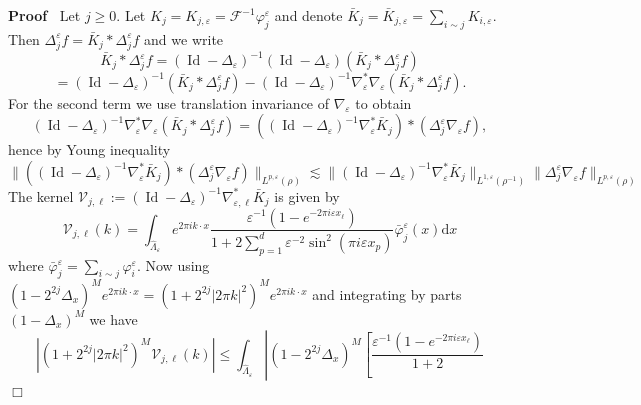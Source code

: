 \documentclass[a4paper,11pt]{article}
\newcommand{\assign}{:=}
\newcommand{\mathd}{\mathrm{d}}
\newcommand{\tmop}[1]{\ensuremath{\operatorname{#1}}}
\newenvironment{proof}{\noindent\textbf{Proof\ }}{\hspace*{\fill}$\Box$\medskip}
\numberwithin{equation}{section}
\begin{document}
\begin{proof}
  Let $j \geqslant 0$. Let $K_j = K_{j, \varepsilon} = \mathcal{F}^{- 1}
  \varphi^{\varepsilon}_j$ and denote $\bar{K}_j = \bar{K}_{j, \varepsilon} =
  \sum_{i \sim j} K_{i, \varepsilon}$. Then 
  $\Delta^{\varepsilon}_j f = \bar{K}_j \ast \Delta^{\varepsilon}_j f$ and we
  write
  \[ \bar{K}_j \ast \Delta^{\varepsilon}_j f = (\tmop{Id} -
     \Delta_{\varepsilon})^{- 1} (\tmop{Id} - \Delta_{\varepsilon}) (\bar{K}_j
     \ast \Delta^{\varepsilon}_j f) \]
  \begin{equation}
    = (\tmop{Id} - \Delta_{\varepsilon})^{- 1} (\bar{K}_j \ast
    \Delta^{\varepsilon}_j f) - (\tmop{Id} - \Delta_{\varepsilon})^{- 1}
    \nabla^{\ast}_{\varepsilon} \nabla_{\varepsilon} (\bar{K}_j \ast
    \Delta^{\varepsilon}_j f) . \label{eq:16}
  \end{equation}
  For the second term we use translation invariance of
  $\nabla_{\varepsilon}$ to obtain
  \[ (\tmop{Id} - \Delta_{\varepsilon})^{- 1} \nabla^{\ast}_{\varepsilon}
     \nabla_{\varepsilon} (\bar{K}_j \ast \Delta^{\varepsilon}_j f) =
     ((\tmop{Id} - \Delta_{\varepsilon})^{- 1} \nabla^{\ast}_{\varepsilon}
     \bar{K}_j) \ast (\Delta^{\varepsilon}_j \nabla_{\varepsilon} f) , \]
  hence by Young inequality
  \[ \| ((\tmop{Id} - \Delta_{\varepsilon})^{- 1} \nabla^{\ast}_{\varepsilon}
     \bar{K}_j) \ast (\Delta^{\varepsilon}_j \nabla_{\varepsilon} f) \|_{L^{p,
     \varepsilon} (\rho)} \lesssim \| (\tmop{Id} - \Delta_{\varepsilon})^{- 1}
     \nabla^{\ast}_{\varepsilon} \bar{K}_j \|_{L^{1, \varepsilon} (\rho^{-
     1})} \| \Delta^{\varepsilon}_j \nabla_{\varepsilon} f \|_{L^{p,
     \varepsilon} (\rho)} \]
  The kernel $\mathcal{V}_{j, \ell} \assign (\tmop{Id} -
  \Delta_{\varepsilon})^{- 1} \nabla^{\ast}_{\varepsilon, \ell} \bar{K}_j$ is
  given by
  \[ \mathcal{V}_{j, \ell} (k) = \int_{\hat{\Lambda}_{\varepsilon}} e^{2 \pi
     ik \cdot x} \frac{\varepsilon^{- 1}  (1 - e^{- 2 \pi i \varepsilon
     x_{\ell} })}{1 + 2 \sum_{p = 1}^d \varepsilon^{- 2} \sin^2 (\pi i
     \varepsilon x_p)} \bar{\varphi}^{\varepsilon}_j (x) \mathd x \]
  where $\bar{\varphi}_j^{\varepsilon} = \sum_{i \sim j}
  \varphi^{\varepsilon}_i$. Now using $(1 - 2^{2 j} \Delta_x)^M e^{2 \pi ik
  \cdot x} = (1 + 2^{2 j} | 2 \pi k |^2)^M e^{2 \pi ik \cdot x}$ and
  integrating by parts $(1 - \Delta_x)^M$ we have
  \[ | (1 + 2^{2 j} | 2 \pi k |^2)^M \mathcal{V}_{j, \ell} (k) | \leqslant
     \int_{\hat{\Lambda}_{\varepsilon}} \left| (1 - 2^{2 j} \Delta_x)^M \left[
     \frac{\varepsilon^{- 1}  (1 - e^{- 2 \pi i \varepsilon x_{\ell} })}{1 + 2
}\]
\end{proof}
\end{document}
